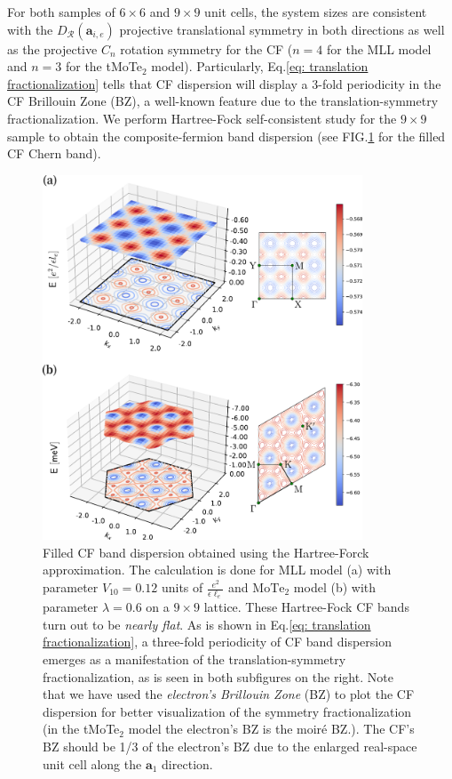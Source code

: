 For both samples of $6\times 6$ and $9\times9$ unit cells, the system sizes are consistent with the $D_{\mathcal R}(\mathbf a_{i,e})$ projective translational symmetry in both directions as well as the projective $C_n$ rotation symmetry for the CF ($n=4$ for the MLL model and $n=3$ for the tMoTe$_2$ model). Particularly, Eq.\eqref{eq: translation fractionalization} tells that CF dispersion will display a $3$-fold periodicity in the CF Brillouin Zone (BZ), a well-known feature due to the translation-symmetry fractionalization. We perform Hartree-Fock self-consistent study for the $9\times9$ sample to obtain the composite-fermion band dispersion (see FIG.\ref{fig: CF dispersion} for the filled CF Chern band). 
\begin{figure}[!htp]
    \centering
    \includegraphics[width=0.85\textwidth]{contents/FCI_ProjWfc/figures/combined_cf_translation_fractionalization.pdf}
    \caption{Filled CF band dispersion obtained using the Hartree-Forck approximation. The calculation is done for MLL model (a) with parameter $V_{10}=0.12$ units of $\frac{e^2}{\epsilon\ell_e}$ and $\mathrm{MoTe_2}$ model (b) with parameter $\lambda=0.6$ on a $9\times9$ lattice. These Hartree-Fock CF bands turn out to be \emph{nearly flat}. As is shown in Eq.\eqref{eq: translation fractionalization}, a three-fold periodicity of CF band dispersion emerges as a manifestation of the translation-symmetry fractionalization, as is seen in both subfigures on the right. Note that we have used the \emph{electron's Brillouin Zone} (BZ) to plot the CF dispersion for better visualization of the symmetry fractionalization (in the tMoTe$_2$ model the electron's BZ is the moiré BZ.). The CF's BZ should be 1/3 of the electron's BZ due to the enlarged real-space unit cell along the $\mathbf a_1$ direction.}
    \label{fig: CF dispersion}
\end{figure}

